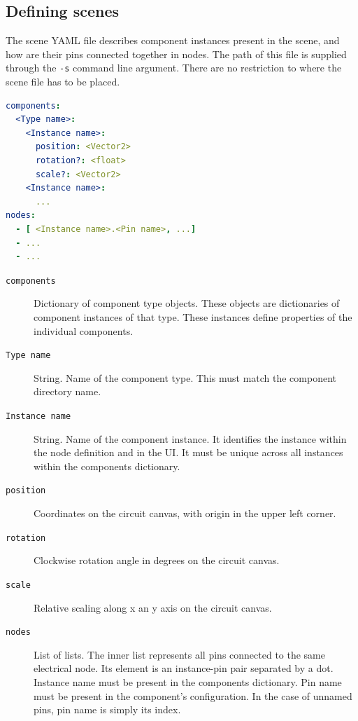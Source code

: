 \subsection{Defining scenes}
The scene YAML file describes component instances present in the scene, and how are their pins connected together in nodes. The path of this file is supplied through the \texttt{-s} command line argument. There are no restriction to where the scene file has to be placed.

\pagebreak

\begin{lstlisting}[language=yaml, caption={YAML scene file structure}]
components:
  <Type name>:
    <Instance name>:
      position: <Vector2>
      rotation?: <float>
      scale?: <Vector2>
    <Instance name>:
      ...
nodes:
  - [ <Instance name>.<Pin name>, ...]
  - ...
  - ...
\end{lstlisting}

\begin{description}
    \item[\texttt{components}]
    Dictionary of component type objects. These objects are dictionaries of component instances of that type. These instances define properties of the individual components. 

    \item[\texttt{Type name}]
    String. Name of the component type. This must match the component directory name.

    \item[\texttt{Instance name}]
    String. Name of the component instance. It identifies the instance within the node definition and in the UI. It must be unique across all instances within the components dictionary.

    \item[\texttt{position}]
    Coordinates on the circuit canvas, with origin in the upper left corner.

    \item[\texttt{rotation}]
    Clockwise rotation angle in degrees on the circuit canvas.

    \item[\texttt{scale}]
    Relative scaling along x an y axis on the circuit canvas.

    \item[\texttt{nodes}]
    List of lists. The inner list represents all pins connected to the same electrical node. Its element is an instance-pin pair separated by a dot. Instance name must be present in the components dictionary. Pin name must be present in the component's configuration. In the case of unnamed pins, pin name is simply its index.
\end{description}


